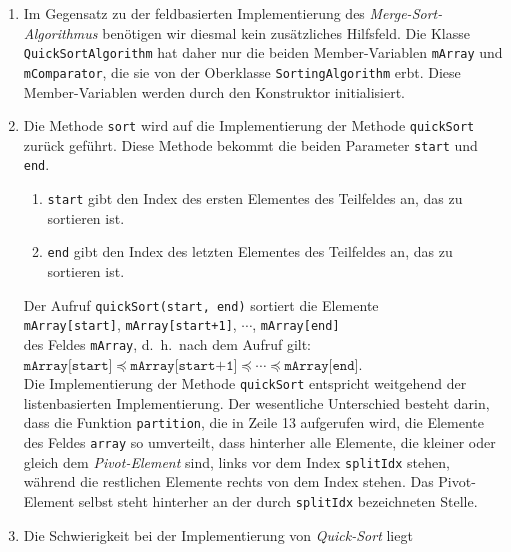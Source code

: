 \begin{enumerate}
\item Im Gegensatz zu der feldbasierten Implementierung des \emph{Merge-Sort-Algorithmus}
      ben\"otigen wir diesmal kein zus\"atzliches Hilfsfeld.  Die Klasse
      \texttt{QuickSortAlgorithm} hat daher nur die beiden Member-Variablen
      \texttt{mArray} und \texttt{mComparator}, die sie von der Oberklasse
      \texttt{SortingAlgorithm} erbt.  Diese Member-Variablen werden durch den 
      Konstruktor initialisiert.
\item Die Methode \texttt{sort} wird auf die Implementierung der Methode
      \texttt{quickSort} zur\"uck gef\"uhrt.  Diese Methode bekommt die beiden Parameter
      \texttt{start} und \texttt{end}.
      \begin{enumerate}
      \item \texttt{start} gibt den Index des ersten Elementes des Teilfeldes an,
            das zu sortieren ist.
      \item \texttt{end} gibt den Index des letzten Elementes des Teilfeldes an,
            das zu sortieren ist.  
      \end{enumerate}
      Der Aufruf \texttt{quickSort(start, end)} sortiert die Elemente \\[0.1cm]
      \hspace*{1.3cm} 
      \texttt{mArray[start]}, \texttt{mArray[start+1]}, $\cdots$, \texttt{mArray[end]}
      \\[0.1cm]
      des Feldes \texttt{mArray}, d.~h.~nach dem Aufruf gilt:\\[0.1cm]
      \hspace*{1.3cm}
      $\texttt{mArray[start]}\preceq\texttt{mArray[start+1]}\preceq\cdots\preceq\texttt{mArray[end]}$.
      \\[0.1cm]
      Die Implementierung der Methode \texttt{quickSort}
      entspricht weitgehend der listenbasierten Implementierung.  Der
      wesentliche Unterschied besteht darin, dass die Funktion \texttt{partition},
      die in Zeile 13 aufgerufen wird,  die
      Elemente des Feldes \texttt{array} so umverteilt, dass hinterher alle Elemente,
      die kleiner oder gleich dem \emph{Pivot-Element} sind, links vor dem
      Index \texttt{splitIdx} stehen, w\"ahrend die restlichen Elemente rechts von dem Index stehen.
      Das Pivot-Element selbst steht hinterher an der durch \texttt{splitIdx}
      bezeichneten Stelle.
\item Die Schwierigkeit bei der Implementierung von \emph{Quick-Sort} liegt

\end{enumerate}
